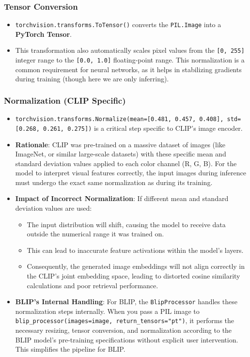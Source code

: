 \documentclass{article}
\begin{document}
\subsubsection{Tensor Conversion}
\begin{itemize}
    \item \texttt{torchvision.transforms.ToTensor()} converts the \texttt{PIL.Image} into a \textbf{PyTorch Tensor}.
    \item This transformation also automatically scales pixel values from the \texttt{[0, 255]} integer range to the \texttt{[0.0, 1.0]} floating-point range. This normalization is a common requirement for neural networks, as it helps in stabilizing gradients during training (though here we are only inferring).
\end{itemize}

\subsubsection{Normalization (CLIP Specific)}
\begin{itemize}
    \item \texttt{torchvision.transforms.Normalize(mean=[0.481, 0.457, 0.408], std=[0.268, 0.261, 0.275])} is a critical step specific to CLIP's image encoder.
    \item \textbf{Rationale}: CLIP was pre-trained on a massive dataset of images (like ImageNet, or similar large-scale datasets) with these specific mean and standard deviation values applied to each color channel (R, G, B). For the model to interpret visual features correctly, the input images during inference must undergo the exact same normalization as during its training.
    \item \textbf{Impact of Incorrect Normalization}: If different mean and standard deviation values are used:
    \begin{itemize}
        \item The input distribution will shift, causing the model to receive data outside the numerical range it was trained on.
        \item This can lead to inaccurate feature activations within the model's layers.
        \item Consequently, the generated image embeddings will not align correctly in the CLIP's joint embedding space, leading to distorted cosine similarity calculations and poor retrieval performance.
    \end{itemize}
    \item \textbf{BLIP's Internal Handling}: For BLIP, the \texttt{BlipProcessor} handles these normalization steps internally. When you pass a PIL image to \texttt{blip\_processor(images=image, return\_tensors="pt")}, it performs the necessary resizing, tensor conversion, and normalization according to the BLIP model's pre-training specifications without explicit user intervention. This simplifies the pipeline for BLIP.
\end{itemize}
\end{document}
